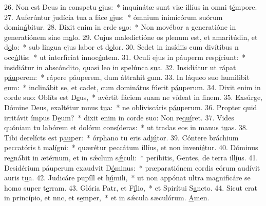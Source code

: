 26. Non est Deus in conspctu \uline{e}jus:~* inquinátæ sunt viæ illíus in omni t\uline{é}mpore.
27. Auferúntur judícia tua a fáce \uline{e}jus:~* ómnium inimicórum suórum domin\uline{á}bitur.
28. Dixit enim in crde s\uline{u}o:~* Non movébor a generatióne in generatiónem sine m\uline{a}lo.
29. Cujus maledictióne os plenum est, et amaritúdin, et d\uline{o}lo:~* sub lingua ejus labor et d\uline{o}lor.
30. Sedet in insídiis cum divítibus n occ\uline{ú}ltis:~* ut interfíciat innoc\uline{é}ntem.
31. Oculi ejus in páuperm resp\uline{í}ciunt:~* insidiátur in abscóndito, quasi leo in spelúnca s\uline{u}a.
32. Insidiátur ut rápat p\uline{áu}perem:~* rápere páuperem, dum áttrahit \uline{e}um.
33. In láqueo suo humilibit \uline{e}um:~* inclinábit se, et cadet, cum dominátus fúerit p\uline{áu}perum.
34. Dixit enim in corde suo: Oblíts est D\uline{e}us,~* avértit fáciem suam ne vídeat in f\uline{i}nem.
35. Exsúrge, Dómine Deus, exaltétur mnus t\uline{u}a:~* ne obliviscáris p\uline{áu}perum.
36. Propter quid irritávit ímpus D\uline{e}um?~* dixit enim in corde suo: Non re\uline{quí}ret.
37. Vides quóniam tu labórem et dolórm cons\uline{í}deras:~* ut tradas eos in manus t\uline{u}as.
38. Tibi derelícts est p\uline{au}per:~* órphano tu eris adj\uline{ú}tor.
39. Cóntere bráchium peccatóris t mal\uline{í}gni:~* quærétur peccátum illíus, et non inveni\uline{é}tur.
40. Dóminus regnábit in ætérnum, et in sǽclum s\uline{ǽ}culi:~* períbitis, Gentes, de terra ill\uline{í}us.
41. Desidérium páuperum exaudvit D\uline{ó}minus:~* præparatiónem cordis eórum audívit auris t\uline{u}a.
42. Judicáre pupíll et h\uline{ú}mili,~* ut non appónat ultra magnificáre se homo super t\uline{e}rram.
43. Glória Patr, et F\uline{í}lio,~* et Spirítui S\uline{a}ncto.
44. Sicut erat in princípio, et nnc, et s\uline{e}mper,~* et in sǽcula sæculórum. \uline{A}men.
